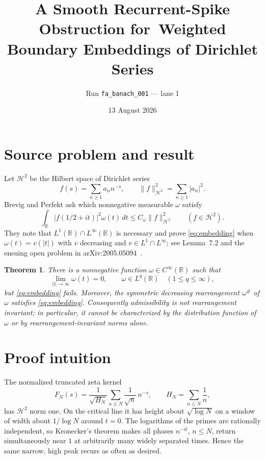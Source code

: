 \documentclass[11pt]{article}
\title{A Smooth Recurrent-Spike Obstruction for\
Weighted Boundary Embeddings of Dirichlet Series}
\author{Run \texttt{fa\_banach\_001} --- lane 1}
\date{13 August 2026}
\newtheorem{theorem}{Theorem}
\newcommand{\HH}{\mathscr H^2}
\newcommand{\R}{\mathbb R}
\begin{document}
\maketitle

\begin{center}
\end{center}

\section{Source problem and result}

Let $\HH$ be the Hilbert space of Dirichlet series
\[
 f(s)=\sum_{n\geq1}a_n n^{-s},\qquad
 \|f\|_{\HH}^2=\sum_{n\geq1}|a_n|^2.
\]
Brevig and Perfekt ask which nonnegative measurable $\omega$ satisfy
\begin{equation}\label{eq:embedding}
 \int_{\R}|f(1/2+it)|^2\omega(t)\,dt
 \leq C_\omega\|f\|_{\HH}^2
 \qquad(f\in\HH).
\end{equation}
They note that $L^1(\R)\cap L^\infty(\R)$ is necessary and prove
\eqref{eq:embedding} when $\omega(t)=v(|t|)$ with $v$ decreasing and
$v\in L^1\cap L^\infty$; see Lemma~7.2 and the ensuing open problem in
arXiv:2005.05094~\cite{source}.

\begin{theorem}\label{thm:main}
There is a nonnegative function $\omega\in C^\infty(\R)$ such that
\[
 \lim_{|t|\to\infty}\omega(t)=0,
 \qquad
 \omega\in L^q(\R)\quad(1\leq q\leq\infty),
\]
but \eqref{eq:embedding} fails.  Moreover, the symmetric decreasing
rearrangement $\omega^\#$ of $\omega$ satisfies \eqref{eq:embedding}.
Consequently admissibility is not rearrangement invariant; in particular,
it cannot be characterized by the distribution function of $\omega$ or by
rearrangement-invariant norms alone.
\end{theorem}

\section{Proof intuition}

The normalized truncated zeta kernel
\[
 F_N(s)=\frac1{\sqrt{H_N}}
 \sum_{n\leq N}\frac1{\sqrt n}\,n^{-s},
 \qquad H_N=\sum_{n\leq N}\frac1n,
\]
has $\HH$ norm one.  On the critical line it has height about
$\sqrt{\log N}$ on a window of width about $1/\log N$ around $t=0$.
The logarithms of the primes are rationally independent, so Kronecker's
theorem makes all phases $n^{-it}$, $n\leq N$, return simultaneously near
$1$ at arbitrarily many widely separated times.  Hence the same narrow,
high peak recurs as often as desired.
\end{document}
